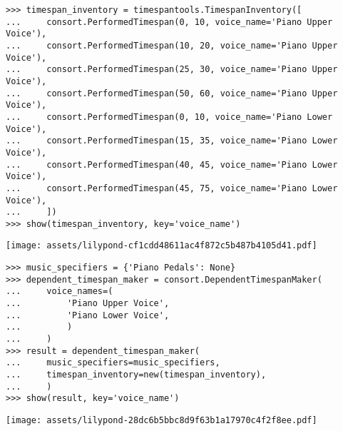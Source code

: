 \begin{singlespacing}
\vspace{-0.5\baselineskip}
\begin{lstlisting}
>>> timespan_inventory = timespantools.TimespanInventory([
...     consort.PerformedTimespan(0, 10, voice_name='Piano Upper Voice'),
...     consort.PerformedTimespan(10, 20, voice_name='Piano Upper Voice'),
...     consort.PerformedTimespan(25, 30, voice_name='Piano Upper Voice'),
...     consort.PerformedTimespan(50, 60, voice_name='Piano Upper Voice'),
...     consort.PerformedTimespan(0, 10, voice_name='Piano Lower Voice'),
...     consort.PerformedTimespan(15, 35, voice_name='Piano Lower Voice'),
...     consort.PerformedTimespan(40, 45, voice_name='Piano Lower Voice'),
...     consort.PerformedTimespan(45, 75, voice_name='Piano Lower Voice'),
...     ])
>>> show(timespan_inventory, key='voice_name')
\end{lstlisting}
\noindent\texttt{[image: assets/lilypond-cf1cdd48611ac4f872c5b487b4105d41.pdf]}
\end{singlespacing}

\begin{comment}
<abjad>
music_specifiers = {'Piano Pedals': None}
dependent_timespan_maker = consort.DependentTimespanMaker(
    voice_names=(
        'Piano Upper Voice',
        'Piano Lower Voice',
        )
    )
result = dependent_timespan_maker(
    music_specifiers=music_specifiers,
    timespan_inventory=new(timespan_inventory),
    )
show(result, key='voice_name')
</abjad>
\end{comment}

\begin{singlespacing}
\vspace{-0.5\baselineskip}
\begin{lstlisting}
>>> music_specifiers = {'Piano Pedals': None}
>>> dependent_timespan_maker = consort.DependentTimespanMaker(
...     voice_names=(
...         'Piano Upper Voice',
...         'Piano Lower Voice',
...         )
...     )
>>> result = dependent_timespan_maker(
...     music_specifiers=music_specifiers,
...     timespan_inventory=new(timespan_inventory),
...     )
>>> show(result, key='voice_name')
\end{lstlisting}
\noindent\texttt{[image: assets/lilypond-28dc6b5bbc8d9f63b1a17970c4f2f8ee.pdf]}
\end{singlespacing}

\begin{comment}
<abjad>
new_dependent_timespan_maker = new(
    dependent_timespan_maker,
    include_inner_starts=True,
    )
result = new_dependent_timespan_maker(
    music_specifiers=music_specifiers,
    timespan_inventory=new(timespan_inventory),
    )
show(result, key='voice_name')
</abjad>
\end{comment}

